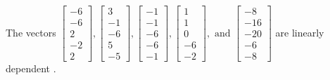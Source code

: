 \begin{exercise}
\begin{exerciseStatement}
  \end{exerciseStatement}
  \begin{exerciseAnswer}
   The vectors \(\left[\begin{array}{r}
-6 \\
-6 \\
2 \\
-2 \\
2
\end{array}\right] , \left[\begin{array}{r}
3 \\
-1 \\
-6 \\
5 \\
-5
\end{array}\right] , \left[\begin{array}{r}
-1 \\
-1 \\
-6 \\
-6 \\
-1
\end{array}\right] , \left[\begin{array}{r}
1 \\
1 \\
0 \\
-6 \\
-2
\end{array}\right] , \text{ and } \left[\begin{array}{r}
-8 \\
-16 \\
-20 \\
-6 \\
-8
\end{array}\right]\) are 
  	 linearly dependent  .
  


  \end{exerciseAnswer}
\end{exercise}
